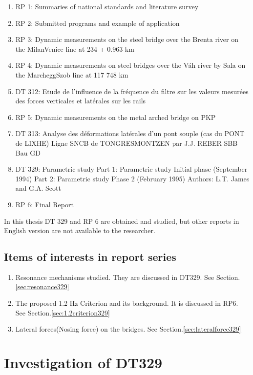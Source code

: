 \begin{enumerate}
    \item RP 1: Summaries of national standards and literature survey
    \item RP 2: Submitted programs and example of application
    \item RP 3: Dynamic measurements on the steel bridge over the Brenta river on the MilanVenice line at 234 + 0.963 km
    \item RP 4: Dynamic measurements on steel bridges over the Váh river by Sala on the MarcheggSzob line at 117 748 km
    \item DT 312: Etude de l'influence de la fréquence du filtre sur les valeurs mesurées des forces verticales et latérales sur les rails
    \item RP 5: Dynamic measurements on the metal arched bridge on PKP
    \item DT 313: Analyse des déformations latérales d'un pont souple (cas du PONT de LIXHE) Ligne SNCB de TONGRESMONTZEN par J.J. REBER SBB Bau GD
    \item DT 329: Parametric study Part 1: Parametric study Initial phase (September 1994) Part 2: Parametric study Phase 2 (February 1995) Authors: L.T. James and G.A. Scott
    \item RP 6: Final Report
\end{enumerate}

In this thesis DT 329 and RP 6 are obtained and studied, but other reports in English version are not available to the researcher.

\subsection{Items of interests in report series}

\begin{enumerate}
    \item Resonance mechanisms studied. They are discussed in DT329. See Section.\ref{sec:resonance329}
    \item The proposed 1.2 Hz Criterion and its background. It is discussed in RP6. See Section.\ref{sec:1.2criterion329}
    \item  Lateral forces(Nosing force) on the bridges. See Section.\ref{sec:lateralforce329}
\end{enumerate}

\section{Investigation of DT329}
